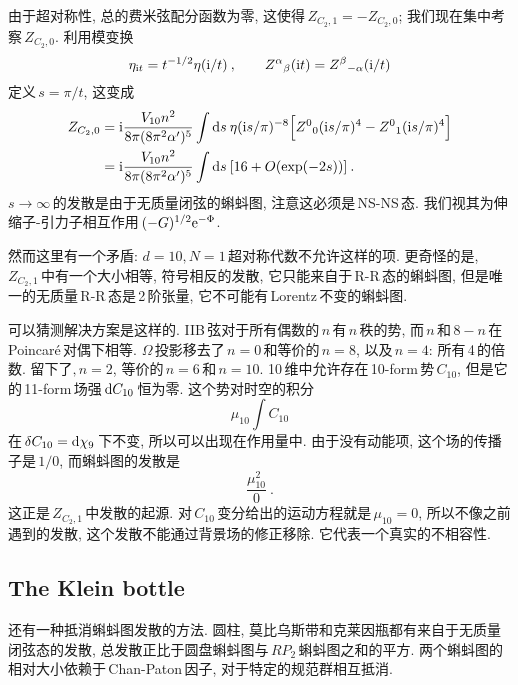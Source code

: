 由于超对称性, 总的费米弦配分函数为零, 这使得$\,Z_{C_{2},1}=-Z_{C_{2},0}$; 我们现在集中考察$\,Z_{C_{2},0}$. 利用模变换
\begin{equation}
    \eta_{\mathrm{i} t} =t^{-1/2} \eta(\mathrm{i}/t) \:, \qquad Z^{\alpha}{}_{\beta}(\mathrm{i} t) = Z^{\beta}{}_{-\alpha}(\mathrm{i}/t)\label{10.8.3}
\end{equation}
定义$\,s=\pi/t$, 这变成
\begin{align}
    Z_{C_{2},0} &= \mathrm{i} \frac{V_{10}n^{2}}{8\pi(8\pi^{2}\alpha^{\prime})^{5}}
    \int \mathrm{d} s\:\eta(\mathrm{i} s/\pi)^{-8}\Bigl[Z^{0}{}_{0}(\mathrm{i} s/\pi)^{4}- Z^{0}{}_{1}(\mathrm{i} s/\pi)^{4} \Bigr] \nonumber \\
    &=\mathrm{i} \frac{V_{10}n^{2}}{8\pi(8\pi^{2}\alpha^{\prime})^{5}}
    \int \mathrm{d} s\: [16 + O(\exp(-2s))] \:. \label{10.8.4}
\end{align}
$s\to\infty\,$的发散是由于无质量闭弦的蝌蚪图, 注意这必须是\,NS-NS\,态. 我们视其为伸缩子-引力子相互作用\,$(-G)^{1/2}\mathrm{e}^{-\Phi}$.

然而这里有一个矛盾: $d=10,N=1\,$超对称代数不允许这样的项. 更奇怪的是, $Z_{C_{2},1}\,$中有一个大小相等, 符号相反的发散, 它只能来自于\,R-R\,态的蝌蚪图, 但是唯一的无质量\,R-R\,态是\,2\,阶张量, 它不可能有\,Lorentz\,不变的蝌蚪图.

可以猜测解决方案是这样的. IIB\,弦对于所有偶数的$\,n\,$有$\,n\,$秩的势, 而$\,n\,$和$\,8-n\,$在\,Poincar\'{e}\,对偶下相等. $\Omega\,$投影移去了$\,n=0\,$和等价的$\,n=8$, 以及$\,n=4$: 所有\,4\,的倍数. 留下了$,n=2$, 等价的$\,n=6\,$和$\,n=10$. 10\,维中允许存在\,10-form\,势\,$C_{10}$, 但是它的\,11-form\,场强$\,\mathrm{d} C_{10}\,$恒为零. 这个势对时空的积分
\begin{equation}
    \mu_{10}\int C_{10} \label{10.8.5}
\end{equation}
在$\,\delta C_{10}=\mathrm{d} \chi_{9}\,$下不变, 所以可以出现在作用量中. 由于没有动能项, 这个场的传播子是$\,1/0$, 而蝌蚪图的发散是
\begin{equation}
    \frac{\mu^{2}_{10}}{0} \:. \label{10.8.6}
\end{equation}
这正是$\,Z_{C_{2},1}\,$中发散的起源. 对$\,C_{10}\,$变分给出的运动方程就是$\,\mu_{10}=0$, 所以不像之前遇到的发散, 这个发散不能通过背景场的修正移除. 它代表一个真实的不相容性.

\subsection*{The Klein bottle}

还有一种抵消蝌蚪图发散的方法. 圆柱, 莫比乌斯带和克莱因瓶都有来自于无质量闭弦态的发散, 总发散正比于圆盘蝌蚪图与$\,RP_{2}\,$蝌蚪图之和的平方. 两个蝌蚪图的相对大小依赖于\,Chan-Paton\,因子, 对于特定的规范群相互抵消.

